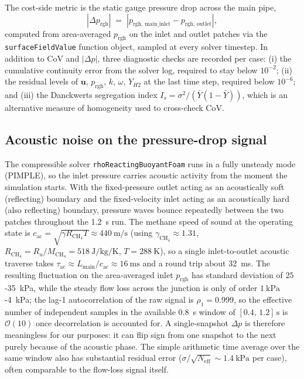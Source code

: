 \documentclass[11pt,a4paper]{article}
\def\Hi{H2}%
\def\CoV{CoV}%
\newcommand{\Hi}{\ensuremath{\mathrm{H_2}}}
\newcommand{\CoV}{\ensuremath{\mathrm{CoV}}}
\begin{document}
The cost-side metric is the static gauge pressure drop across the
main pipe,
\begin{equation}
|\Delta p_{\mathrm{rgh}}| \;=\; |p_{\mathrm{rgh,\,main\_inlet}} -
p_{\mathrm{rgh,\,outlet}}|,
\label{eq:dp}
\end{equation}
computed from area-averaged \(p_{\mathrm{rgh}}\) on the inlet and
outlet patches via the \texttt{surfaceFieldValue} function object,
sampled at every solver timestep. In addition to \CoV{} and
\(|\Delta p|\), three diagnostic checks are recorded per case:
(i) the cumulative continuity error from the solver log, required
to stay below \(10^{-2}\); (ii) the residual levels of
\(\mathbf{u},\,p_{\mathrm{rgh}},\,k,\,\omega,\,Y_{\Hi}\) at the
last time step, required below \(10^{-6}\); and (iii) the
Danckwerts segregation index \(I_s = \sigma^2 / (\bar Y(1-\bar Y))\),
which is an alternative measure of homogeneity used to cross-check
\CoV.

\subsection{Acoustic noise on the pressure-drop signal}
\label{sec:dp_filter}
The compressible solver \texttt{rhoReactingBuoyantFoam} runs in a
fully unsteady mode (PIMPLE), so the inlet pressure carries
acoustic activity from the moment the simulation starts. With the
fixed-pressure outlet acting as an acoustically soft (reflecting)
boundary and the fixed-velocity inlet acting as an acoustically
hard (also reflecting) boundary, pressure waves bounce repeatedly
between the two patches throughout the \SI{1.2}{\second} run. The
methane speed of sound at the operating state is
\(c_{\mathrm{ac}} = \sqrt{\gamma R_{\mathrm{CH_4}} T} \approx
\SI{440}{\meter\per\second}\) (using
\(\gamma_{\mathrm{CH_4}} \approx 1.31\),
\(R_{\mathrm{CH_4}} = R_u/M_{\mathrm{CH_4}} =
\SI{518}{\joule\per\kilogram\per\kelvin}\),
\(T = \SI{288}{\kelvin}\)), so a single inlet-to-outlet acoustic
traverse takes \(\tau_{\mathrm{ac}} \approx
L_{\mathrm{main}}/c_{\mathrm{ac}} \approx \SI{16}{\milli\second}\)
and a round trip about \SI{32}{\milli\second}. The resulting
fluctuation on the area-averaged inlet \(p_{\mathrm{rgh}}\) has
standard deviation of \(25\)-\SI{35}{\kilo\pascal}, while the
steady flow loss across the junction is only of order
\(\SI{1}{\kilo\pascal}\)-\SI{4}{\kilo\pascal}; the lag-1
autocorrelation of the raw signal is \(\rho_1 = 0.999\), so the
effective number of independent samples in the available
\SI{0.8}{\second} window of \([0.4,\,1.2]\,\si{\second}\) is
\(\mathcal{O}(10)\) once decorrelation is accounted for.
A single-snapshot \(\Delta p\) is therefore meaningless for our
purposes: it can flip sign from one snapshot to the next purely
because of the acoustic phase. The simple arithmetic time average
over the same window also has substantial residual error
(\(\sigma/\sqrt{N_{\mathrm{eff}}} \sim
\SI{1.4}{\kilo\pascal}\) per case), often comparable to the
flow-loss signal itself.
\end{document}
